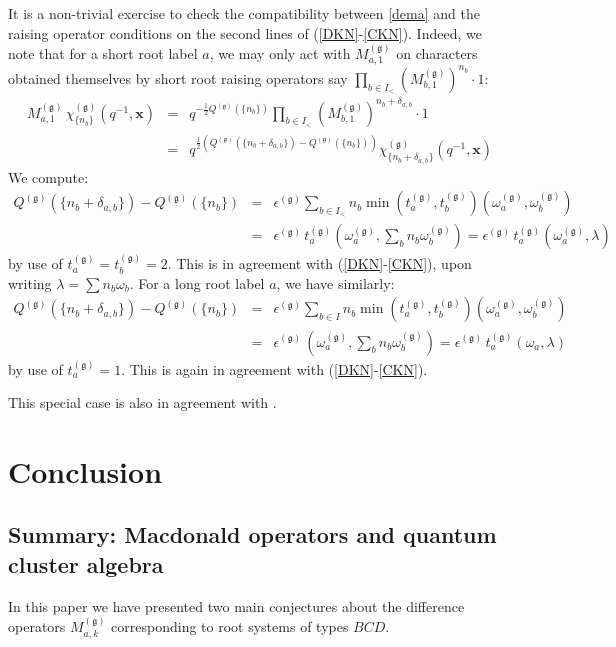 \documentclass[12pt]{amsart}
\newcommand{\g}{{\mathfrak{g}}}
\newcommand{\bx}{{\mathbf x}}
\newcommand{\half}{\frac12}
\numberwithin{equation}{section}
\numberwithin{table}{section}
\begin{document}
It is a non-trivial exercise to check the compatibility between \eqref{dema} and the raising operator
conditions on the second lines of (\ref{DKN}-\ref{CKN}). Indeed, we note that for a short root label $a$,
we may only act with $M_{a,1}^{(\g)}$ on characters obtained themselves by short root raising operators
say $\prod_{b\in I_<} (M_{b,1}^{(\g)})^{n_b}\cdot 1$:
\begin{eqnarray*}M_{a,1}^{(\g)}\, \chi_{\{n_b\}}^{(\g)}(q^{-1},\bx)&=&q^{-\half Q^{(\g)}(\{n_b\})} \prod_{b\in I_<} 
(M_{b,1}^{(\g)})^{n_b+\delta_{a,b}}\cdot 1\\
&=&q^{\half(Q^{(\g)}(\{n_b+\delta_{a,b}\})-Q^{(\g)}(\{n_b\}))} \chi_{\{n_b+\delta_{a,b}\}}^{(\g)}(q^{-1},\bx)
\end{eqnarray*}
We compute:
\begin{eqnarray*}Q^{(\g)}(\{n_b+\delta_{a,b}\})-Q^{(\g)}(\{n_b\})&=&\epsilon^{(\g)} \sum_{b\in I_<} n_b \min(t_a^{(\g)},t_b^{(\g)}) (\omega_a^{(\g)},\omega_b^{(\g)})\\
&=&
\epsilon^{(\g)}\, t_a^{(\g)} (\omega_a^{(\g)},\sum_b n_b \omega_b^{(\g)})=\epsilon^{(\g)}\, t_a^{(\g)} (\omega_a^{(\g)},\lambda)
\end{eqnarray*}
by use of $t_a^{(\g)}=t_b^{(\g)}=2$. This is
in agreement with (\ref{DKN}-\ref{CKN}), upon writing $\lambda=\sum n_b \omega_b$.
For a long root label $a$, we have similarly:
\begin{eqnarray*}Q^{(\g)}(\{n_b+\delta_{a,b}\})-Q^{(\g)}(\{n_b\})&=&\epsilon^{(\g)} \sum_{b\in I} n_b \min(t_a^{(\g)},t_b^{(\g)}) (\omega_a^{(\g)},\omega_b^{(\g)})\\
&=&
\epsilon^{(\g)}\,  (\omega_a^{(\g)},\sum_b n_b \omega_b^{(\g)})=\epsilon^{(\g)}\, t_a^{(\g)} (\omega_a,\lambda)
\end{eqnarray*}
by use of $t_a^{(\g)}=1$. This is again in agreement with (\ref{DKN}-\ref{CKN}).

This special case is also in agreement with \cite{LNSSS}.




\section{Conclusion}

\subsection{Summary: Macdonald operators and quantum cluster algebra}
In this paper we have presented two main conjectures about the difference operators $M_{a,k}^{(\g)}$ corresponding to  root systems of  types $BCD$. 
\end{document}
